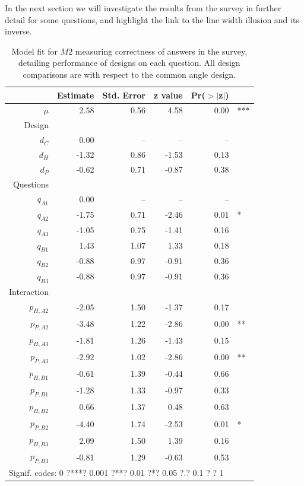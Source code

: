 In the next section we will investigate the results from the survey in further detail for some questions, and highlight the link to the line width illusion and its inverse.
\begin{table}[ht]
\begin{center}
\begin{tabular}{rrrrrl}
  \hline
 & Estimate & Std. Error & z value & Pr($>$$|$z$|$) & \\ 
  \hline
$\mu$ & 2.58 & 0.56 & 4.58 & 0.00  & ***\\ [5pt]
Design\\
  $d_C$ & 0.00 & -- & -- & -- \\ 
  $d_H$ & -1.32 & 0.86 & -1.53 & 0.13 \\ 
  $d_P$ & -0.62 & 0.71 & -0.87 & 0.38 \\ [5pt]
Questions\\
  $q_{A1}$ & 0.00 & -- & -- & -- \\ 
  $q_{A2}$  & -1.75 & 0.71 & -2.46 & 0.01 &* \\ 
  $q_{A3}$  & -1.05 & 0.75 & -1.41 & 0.16 \\ 
  $q_{B1}$  & 1.43 & 1.07 & 1.33 & 0.18 \\ 
  $q_{B2}$  & -0.88 & 0.97 & -0.91 & 0.36 \\ 
  $q_{B3}$  & -0.88 & 0.97 & -0.91 & 0.36 \\ [5pt]
Interaction \\
$p_{H, A2}$ & -2.05 & 1.50 & -1.37 & 0.17 \\ 
$p_{P,A2}$ & -3.48 & 1.22 & -2.86 & 0.00 &**\\ 
$p_{H,A3}$ & -1.81 & 1.26 & -1.43 & 0.15 \\ 
$p_{P,A3}$ & -2.92 & 1.02 & -2.86 & 0.00 &**\\ 
$p_{H,B1}$ & -0.61 & 1.39 & -0.44 & 0.66 \\ 
$p_{P,B1}$ & -1.28 & 1.33 & -0.97 & 0.33 \\ 
$p_{H,B2}$ & 0.66 & 1.37 & 0.48 & 0.63 \\ 
$p_{P,B2}$ & -4.40 & 1.74 & -2.53 & 0.01 &*\\ 
$p_{H,B3}$ & 2.09 & 1.50 & 1.39 & 0.16 \\ 
$p_{P,B3}$ & -0.81 & 1.29 & -0.63 & 0.53 \\ 
   \hline
\multicolumn{5}{l}{Signif. codes:  0 ?***? 0.001 ?**? 0.01 ?*? 0.05 ?.? 0.1 ? ? 1 }
\end{tabular}
\end{center}
\caption{\label{model2} Model fit for $M2$ measuring correctness of answers in the survey, detailing performance of designs on each question. All design comparisons are with respect to the common angle design.}
\end{table}


